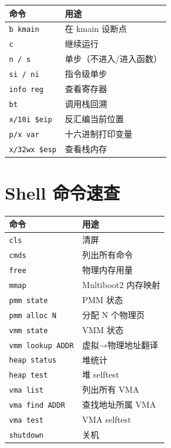 \begin{longtable}{ll}
  \toprule
  \textbf{命令} & \textbf{用途} \\
  \midrule
  \texttt{b kmain}            & 在 kmain 设断点 \\
  \texttt{c}                  & 继续运行 \\
  \texttt{n / s}              & 单步（不进入/进入函数） \\
  \texttt{si / ni}            & 指令级单步 \\
  \texttt{info reg}           & 查看寄存器 \\
  \texttt{bt}                 & 调用栈回溯 \\
  \texttt{x/10i \$eip}        & 反汇编当前位置 \\
  \texttt{p/x var}            & 十六进制打印变量 \\
  \texttt{x/32wx \$esp}       & 查看栈内存 \\
  \bottomrule
\end{longtable}

\section{Shell 命令速查}

\begin{longtable}{ll}
  \toprule
  \textbf{命令} & \textbf{用途} \\
  \midrule
  \texttt{cls}              & 清屏 \\
  \texttt{cmds}             & 列出所有命令 \\
  \texttt{free}             & 物理内存用量 \\
  \texttt{mmap}             & Multiboot2 内存映射 \\
  \texttt{pmm state}        & PMM 状态 \\
  \texttt{pmm alloc N}      & 分配 N 个物理页 \\
  \texttt{vmm state}        & VMM 状态 \\
  \texttt{vmm lookup ADDR}  & 虚拟→物理地址翻译 \\
  \texttt{heap status}      & 堆统计 \\
  \texttt{heap test}        & 堆 selftest \\
  \texttt{vma list}         & 列出所有 VMA \\
  \texttt{vma find ADDR}    & 查找地址所属 VMA \\
  \texttt{vma test}         & VMA selftest \\
  \texttt{shutdown}         & 关机 \\
  \bottomrule
\end{longtable}
